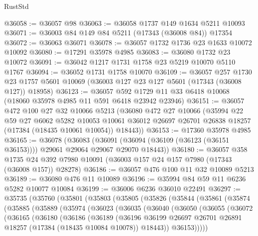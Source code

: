 \begin{lexlean}{RustStd}
\begin{coremodule}
@36058 := @36057 @98
@36063 := @36058 @1737 @149 @1634 @5211 @10093
@36071 := @36003 @84 @149 @84 @5211 (@17343 (@36008 @84)) @17354
@36072 := @36063 @36071
@36078 := @36057 @1732 @1736 @23 @1633 @10072 @10092
@36080 := @17291 @35978 @4985
@36083 := @36080 @1732 @23 @10072
@36091 := @36042 @1217 @1731 @1758 @23 @5219 @10070 @5110 @1767
@36094 := @36052 @1731 @1758 @10070
@36109 := @36057
    @257
    @1730
    @23
    @1757
    @5601
    @10069
    (@36003 @127 @23 @127 @5601 (@17343 (@36008 @127)) @18958)
@36123 := @36057 @592 @1729 @11 @33 @6418 @10068 (@18060 @35978 @4985 @11 @591 @6418 @23942 @23946)
@36151 := @36057
    @472
    @100
    @27
    @32
    @10066
    @5213
    (@36080
      @472
      @27
      @10066
      (@35994
        @22
        @59
        @27
        @6062
        @5282
        @10053
        @10061
        @36012
        @26697
        @26701
        @26838
        @18257
        (@17384 (@18435 @10061 @10054))
        @18443))
@36153 := @17360 @35978 @4985
@36165 := @36078
    (@36083 (@36091 (@36094 (@36109 (@36123 (@36151 @36153)))) @29061 @29064 @29067 @29070 @18443))
@36180 := @36057
    @358
    @1735
    @24
    @392
    @7980
    @10091
    (@36003 @157 @24 @157 @7980 (@17343 (@36008 @157)) @28278)
@36186 := @36057 @476 @100 @11 @32 @10089 @5213
@36189 := @36080 @476 @11 @10089
@36196 := @35994 @84 @59 @11 @6236 @5282 @10077 @10084
@36199 := @36006 @6236 @36010 @22491
@36297 := @35735
    (@35760
      (@35801
        (@35803
          (@35805
            (@35826
              (@35844
                (@35861
                  (@35874
                    (@35885
                      (@35889
                        (@35974
                          (@36023
                            (@36035
                              (@36040
                                (@36050
                                  (@36055
                                    (@36072
                                      (@36165
                                        (@36180
                                          (@36186
                                            (@36189
                                              (@36196
                                                @36199
                                                @26697
                                                @26701
                                                @26891
                                                @18257
                                                (@17384 (@18435 @10084 @10078))
                                                @18443))
                                            @36153)))))

\end{coremodule}
\end{lexlean}
